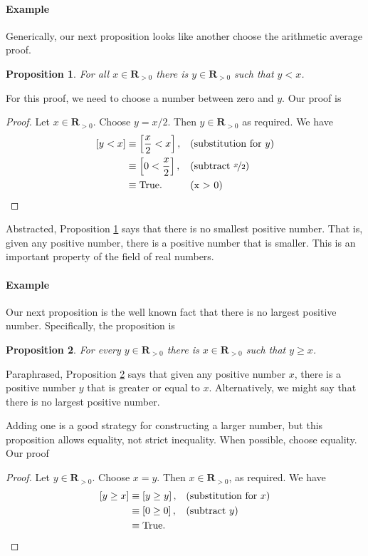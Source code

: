 \documentclass[12pt,fleqn]{article}
\newcommand{\reals}{\mathbf{R}}
\newcommand{\true}{\mathrm{True}}
\newenvironment{myproof}
  {\begin{shaded}\begin{proof}}
  {\end{proof}\end{shaded}}
\newtheorem{prop}{Proposition}
\newcounter{ex}\setcounter{ex}{0}
\newcommand{\ex}{%
\setcounter{ex}{\value{ex}+1}
\paragraph{Example \theex}}
\begin{document}
 

 \ex   Generically, our next proposition looks like another choose 
 the arithmetic average proof. 
      
    \begin{prop}   For all $x \in \reals_{>0}$ there is 
      $y \in \reals_{> 0}$ such that $y < x$.  \label{p5}
    \end{prop}
   
    For this proof,  we need to choose a  number between  zero and $y$. Our proof is
      \begin{myproof}  Let $x \in \reals_{>0}$. Choose $y = x/2$. Then $y \in \reals_{>0}$ as required. We have
         \begin{align*}
         \left[y < x \right] &\equiv \left[\frac{x}{2} < x \right], &&\text{(substitution for $y$)} \\
                                   &\equiv \left[0 < \frac{x}{2}  \right], &&\text{(subtract $\nicefrac{x}{2}$)} \\
                                   &\equiv \true.  &&\text{(x > 0)} \qedhere
      \end{align*}
      \end{myproof}
Abstracted, Proposition \ref{p5} says that there is no smallest positive number. That is, given any positive number, there is a 
positive number that is smaller.  This is an important property of the field of real numbers.
       
\ex Our next proposition is the well known fact that there is
no largest positive number. Specifically, the proposition is
       \begin{prop} For every $y \in \reals_{> 0}$ there is  
        $x \in \reals_{>0}$ such that $y \geq  x$. \label{p6}
      \end{prop}
      Paraphrased, Proposition \ref{p6} says that given any positive number $x$, there is a positive number $y$ that is greater or equal to $x$. Alternatively, we
      might say that there is no largest positive number. 
      
      Adding one is a good strategy for constructing a larger number, but this proposition
      allows equality, not strict inequality.  When possible, choose equality. Our proof
      
       \begin{myproof} Let $y \in \reals_{>0}$. Choose $x = y$. Then $x \in \reals_{>0}$, as 
        required. We have
       \begin{align*}
         \left[y \geq x  \right] &\equiv \left[y \geq  y \right], && \text{(substitution for $x$)} \\
                                      &\equiv \left[0 \geq 0 \right], &&\text{(subtract $y$)} \\
                                      &\equiv \true. && \qedhere
       \end{align*}
       
       \end{myproof}
\end{document}
